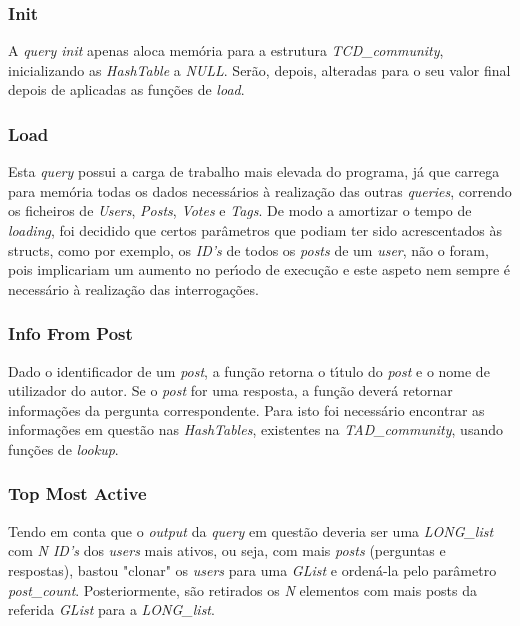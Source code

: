 \documentclass{article}
\begin{document}
\subsubsection{Init}
\par A \emph{query init} apenas aloca mem\'{o}ria para a estrutura \emph{TCD\_community}, inicializando as \emph{HashTable} a \emph{NULL}. Ser\~{a}o, depois, alteradas para o seu valor final depois de aplicadas as fun\c{c}\~{o}es de \emph{load}.

\subsubsection{Load}
\par Esta \emph{query} possui a carga de trabalho mais elevada do programa, j\'{a} que carrega para mem\'{o}ria todas os dados necess\'{a}rios \`{a} realiza\c{c}\~{a}o das outras \emph{queries}, correndo os ficheiros de \emph{Users}, \emph{Posts}, \emph{Votes} e \emph{Tags}. De modo a amortizar o tempo de \emph{loading}, foi decidido que certos par\^{a}metros que podiam ter sido acrescentados \`{a}s structs, como por exemplo, os \emph{ID's} de todos os \emph{posts} de um \emph{user}, n\~{a}o o foram, pois implicariam um aumento no per\'{\i}odo de execu\c{c}\~{a}o e este aspeto nem sempre \'{e} necess\'{a}rio \`{a} realiza\c{c}\~{a}o das interroga\c{c}\~{o}es.

\subsubsection{Info From Post}
\par Dado o identificador de um \emph{post}, a fun\c{c}\~{a}o retorna o t\'{\i}tulo do \emph{post} e o nome de utilizador do autor. Se o \emph{post} for uma resposta, a fun\c{c}\~{a}o dever\'{a} retornar informa\c{c}\~{o}es da pergunta correspondente. Para isto foi necess\'{a}rio encontrar as informa\c{c}\~{o}es em quest\~{a}o nas \emph{HashTables}, existentes na \emph{TAD\_community}, usando fun\c{c}\~{o}es de \emph{lookup}.  

\subsubsection{Top Most Active}
\par Tendo em conta que o \emph{output} da \emph{query} em quest\~{a}o deveria ser uma \emph{LONG\_list} com \emph{N ID's} dos \emph{users} mais ativos, ou seja, com mais \emph{posts} (perguntas e respostas), bastou "clonar" os \emph{users} para uma \emph{GList} e orden\'{a}-la pelo par\^{a}metro \emph{post\_count}. Posteriormente, s\~{a}o retirados os \emph{N} elementos com mais posts da referida \emph{GList} para a \emph{LONG\_list}.  
\end{document}
